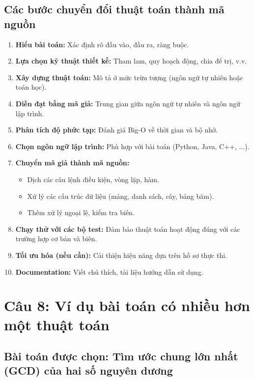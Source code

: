 \documentclass[12pt,a4paper]{article}
\begin{document}
\subsection*{Các bước chuyển đổi thuật toán thành mã nguồn}

\begin{enumerate}
    \item \textbf{Hiểu bài toán:} Xác định rõ đầu vào, đầu ra, ràng buộc.
    \item \textbf{Lựa chọn kỹ thuật thiết kế:} Tham lam, quy hoạch động, chia để trị, v.v.
    \item \textbf{Xây dựng thuật toán:} Mô tả ở mức trừu tượng (ngôn ngữ tự nhiên hoặc toán học).
    \item \textbf{Diễn đạt bằng mã giả:} Trung gian giữa ngôn ngữ tự nhiên và ngôn ngữ lập trình.
    \item \textbf{Phân tích độ phức tạp:} Đánh giá Big-O về thời gian và bộ nhớ.
    \item \textbf{Chọn ngôn ngữ lập trình:} Phù hợp với bài toán (Python, Java, C++, ...).
    \item \textbf{Chuyển mã giả thành mã nguồn:}
    \begin{itemize}
        \item Dịch các câu lệnh điều kiện, vòng lặp, hàm.
        \item Xử lý các cấu trúc dữ liệu (mảng, danh sách, cây, bảng băm).
        \item Thêm xử lý ngoại lệ, kiểm tra biên.
    \end{itemize}
    \item \textbf{Chạy thử với các bộ test:} Đảm bảo thuật toán hoạt động đúng với các trường hợp cơ bản và biên.
    \item \textbf{Tối ưu hóa (nếu cần):} Cải thiện hiệu năng dựa trên hồ sơ thực thi.
    \item \textbf{Documentation:} Viết chú thích, tài liệu hướng dẫn sử dụng.
\end{enumerate}

\section*{Câu 8: Ví dụ bài toán có nhiều hơn một thuật toán}

\subsection*{Bài toán được chọn: Tìm ước chung lớn nhất (GCD) của hai số nguyên dương}
\end{document}
